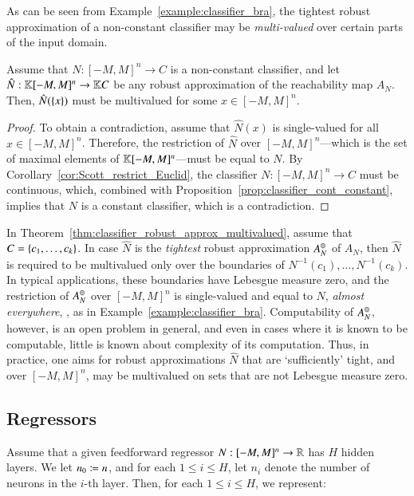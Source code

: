 \documentclass[11pt,times]{article}
\begin{document}
As can be seen from Example~\ref{example:classifier_bra}, the tightest
robust approximation of a non-constant classifier may be
\emph{multi-valued} over certain parts of the input domain. 

\begin{theorem}
  \label{thm:classifier_robust_approx_multivalued}
  Assume that $N: [-M,M]^n \to C$ is a non-constant classifier, and let
  $\hat{N}: \mathbb{K}[-M,M]^n \to \mathbb{K}C$ be any robust approximation
  of the reachability map $A_N$. Then, $\hat{N}(\left\{{x}\right\})$ must be
  multivalued for some $x \in [-M,M]^n$.
\end{theorem}

\begin{proof}
  To obtain a contradiction, assume that $\hat{N}(x)$ is single-valued
  for all $x \in [-M,M]^n$. Therefore, the restriction of $\hat{N}$
  over $[-M,M]^n$---which is the set of maximal elements of
  $\mathbb{K}[-M,M]^n$---must be equal to $N$. By
  Corollary~\ref{cor:Scott_restrict_Euclid}, the classifier
  $N : [-M,M]^n \to C$ must be continuous, which, combined with
  Proposition~\ref{prop:classifier_cont_constant}, implies that $N$ is
  a constant classifier, which is a contradiction.
\end{proof}


In Theorem~\ref{thm:classifier_robust_approx_multivalued}, assume that
$C = \left\{{c_1, \ldots, c_k}\right\}$. In case $\hat{N}$ is the \emph{tightest}
robust approximation $A_N^\circledcirc$ of $A_N$, then $\hat{N}$ is required
to be multivalued only over the boundaries of
$N^{-1}(c_1), \ldots, N^{-1}(c_k)$. In typical applications, these
boundaries have Lebesgue measure zero, and the restriction of
$A_N^\circledcirc$ over $[-M,M]^n$ is single-valued and equal to $N$,
\emph{almost everywhere}, {\eg}, as in
Example~\ref{example:classifier_bra}. Computability of $A_N^\circledcirc$,
however, is an open problem in general, and even in cases where it is
known to be computable, little is known about complexity of its
computation. Thus, in practice, one aims for robust approximations
$\hat{N}$ that are `sufficiently' tight, and over $[-M,M]^n$, may be
multivalued on sets that are not Lebesgue measure zero.


\subsection{Regressors}
\label{seubsec:regressors}




Assume that a given feedforward regressor $N: [-M,M]^n \to \mathbb{R}$ has $H$
hidden layers. We let $n_0 \coloneqq n$, and for each $1 \leq i \leq H$,
let $n_i$ denote the number of neurons in the $i$-th layer. Then, for
each $1 \leq i \leq H$, we represent:
\end{document}
